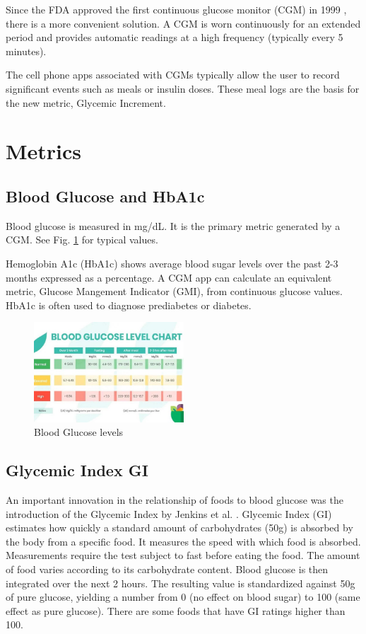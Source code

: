 \documentclass[conference]{IEEEtran}
\begin{document}
Since the FDA approved the first continuous glucose monitor (CGM) in 1999 \cite{Reddy_2023}, there is a more convenient solution. A CGM is worn continuously for an extended period and provides automatic readings at a high frequency (typically every 5 minutes).

The cell phone apps associated with CGMs typically allow the user to record significant events such as meals or insulin doses. These meal logs are the basis for the new metric, Glycemic Increment.

\section{Metrics}

\subsection{Blood Glucose and HbA1c}

Blood glucose is measured in mg/dL. It is the primary metric generated by a CGM. See Fig. \ref{fig:glucose_chart} for typical values.

Hemoglobin A1c (HbA1c) shows average blood sugar levels over the past 2-3 months expressed as a percentage. A CGM app can calculate an equivalent metric, Glucose Mangement Indicator (GMI), from continuous glucose values. HbA1c is often used to diagnose prediabetes or diabetes.

\begin{figure}[tbp]
    \includegraphics[width=0.5\textwidth]{images/Normal-Blood-Sugar-Levels-Chart.jpg}
    \caption{Blood Glucose levels
    \protect\cite{Agarwal_2025}}
    \label{fig:glucose_chart}
\end{figure}

\subsection{Glycemic Index GI}

An important innovation in the relationship of foods to blood glucose was the introduction of the Glycemic Index by Jenkins et al. \cite{Jenkins_1981}. Glycemic Index (GI) estimates how quickly a standard amount of carbohydrates (50g) is absorbed by the body from a specific food. It measures the speed with which food is absorbed. Measurements require the test subject to fast before eating the food. The amount of food varies according to its carbohydrate content. Blood glucose is then integrated over the next 2 hours. The resulting value is standardized against 50g of pure glucose, yielding a number from 0 (no effect on blood sugar) to 100 (same effect as pure glucose). There are some foods that have GI ratings higher than 100.
\end{document}
